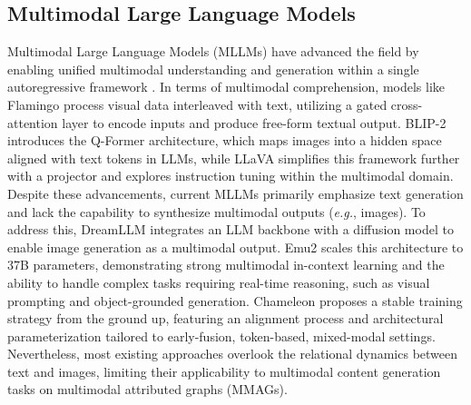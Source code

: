 \subsection{Multimodal Large Language Models}
Multimodal Large Language Models (MLLMs) have advanced the field by enabling unified multimodal understanding and generation within a single autoregressive framework \cite{yin2023surveymllm, zhang2024mm}. In terms of multimodal comprehension, models like Flamingo \cite{alayrac2022flamingo} process visual data interleaved with text, utilizing a gated cross-attention layer to encode inputs and produce free-form textual output. BLIP-2 \cite{li2023blip} introduces the Q-Former architecture, which maps images into a hidden space aligned with text tokens in LLMs, while LLaVA \cite{liu2024llava} simplifies this framework further with a projector and explores instruction tuning within the multimodal domain. Despite these advancements, current MLLMs primarily emphasize text generation and lack the capability to synthesize multimodal outputs (\textit{e.g.}, images).
To address this, DreamLLM \cite{dong2024dreamllmsynergisticmultimodalcomprehension} integrates an LLM backbone with a diffusion model to enable image generation as a multimodal output. Emu2 \cite{sun2024generative} scales this architecture to 37B parameters, demonstrating strong multimodal in-context learning and the ability to handle complex tasks requiring real-time reasoning, such as visual prompting and object-grounded generation. Chameleon \cite{team2024chameleon} proposes a stable training strategy from the ground up, featuring an alignment process and architectural parameterization tailored to early-fusion, token-based, mixed-modal settings. Nevertheless, most existing approaches overlook the relational dynamics between text and images, limiting their applicability to multimodal content generation tasks on multimodal attributed graphs (MMAGs).

